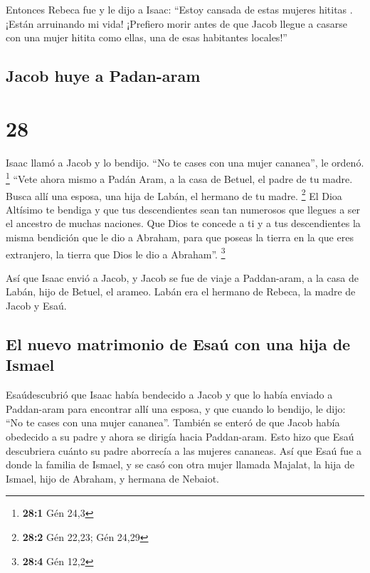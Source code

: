  Entonces Rebeca fue y le dijo a Isaac: ``Estoy cansada
de estas mujeres hititas . ¡Están arruinando mi vida! ¡Prefiero morir
antes de que Jacob llegue a casarse con una mujer hitita como ellas, una
de esas habitantes locales!''

\hypertarget{jacob-huye-a-padan-aram}{%
\subsection{Jacob huye a Padan-aram}\label{jacob-huye-a-padan-aram}}

\hypertarget{section-27}{%
\section{28}\label{section-27}}

 Isaac llamó a Jacob y lo bendijo. ``No te cases con una
mujer cananea'', le ordenó. \footnote{\textbf{28:1} Gén 24,3}
 ``Vete ahora mismo a Padán Aram, a la casa de Betuel, el
padre de tu madre. Busca allí una esposa, una hija de Labán, el hermano
de tu madre. \footnote{\textbf{28:2} Gén 22,23; Gén 24,29}
 El Dioa Altísimo te bendiga y que tus descendientes sean
tan numerosos que llegues a ser el ancestro de muchas naciones.
 Que Dios te concede a ti y a tus descendientes la misma
bendición que le dio a Abraham, para que poseas la tierra en la que eres
extranjero, la tierra que Dios le dio a Abraham''. \footnote{\textbf{28:4}
  Gén 12,2}

 Así que Isaac envió a Jacob, y Jacob se fue de viaje a
Paddan-aram, a la casa de Labán, hijo de Betuel, el arameo. Labán era el
hermano de Rebeca, la madre de Jacob y Esaú.

\hypertarget{el-nuevo-matrimonio-de-esauxfa-con-una-hija-de-ismael}{%
\subsection{El nuevo matrimonio de Esaú con una hija de
Ismael}\label{el-nuevo-matrimonio-de-esauxfa-con-una-hija-de-ismael}}

 Esaúdescubrió que Isaac había bendecido a Jacob y que lo
había enviado a Paddan-aram para encontrar allí una esposa, y que cuando
lo bendijo, le dijo: ``No te cases con una mujer cananea''.
 También se enteró de que Jacob había obedecido a su padre
y ahora se dirigía hacia Paddan-aram.  Esto hizo que Esaú
descubriera cuánto su padre aborrecía a las mujeres cananeas.
 Así que Esaú fue a donde la familia de Ismael, y se casó
con otra mujer llamada Majalat, la hija de Ismael, hijo de Abraham, y
hermana de Nebaiot.

